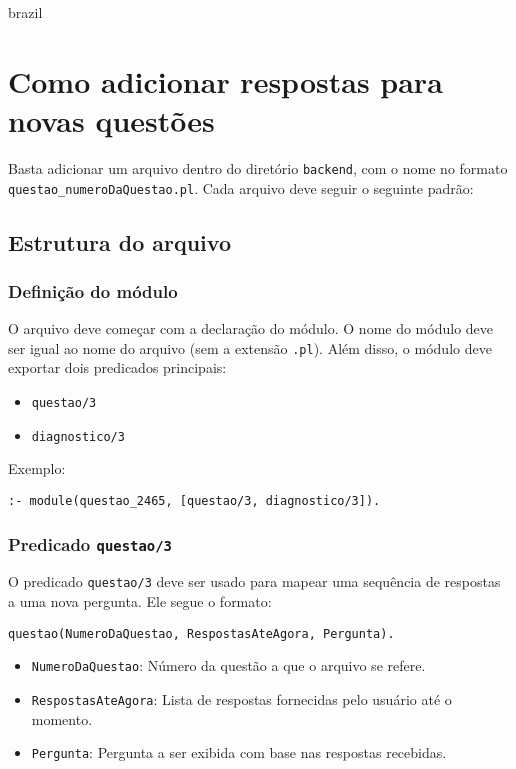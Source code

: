 \begin{otherlanguage*}{brazil}

\chapter{Como adicionar respostas para novas questões}
\label{manual:adicionar-respostas}

Basta adicionar um arquivo dentro do diretório \texttt{\/backend}, com o nome no formato \texttt{questao\_{numeroDaQuestao}.pl}. Cada arquivo deve seguir o seguinte padrão:

\section{Estrutura do arquivo}

\subsection{Definição do módulo}
O arquivo deve começar com a declaração do módulo. O nome do módulo deve ser igual ao nome do arquivo (sem a extensão \texttt{.pl}). Além disso, o módulo deve exportar dois predicados principais:  
\begin{itemize}
    \item \texttt{questao/3}
    \item \texttt{diagnostico/3}
\end{itemize}

Exemplo:
\begin{verbatim}
:- module(questao_2465, [questao/3, diagnostico/3]).
\end{verbatim}

\subsection{Predicado \texttt{questao/3}}
O predicado \texttt{questao/3} deve ser usado para mapear uma sequência de respostas a uma nova pergunta. Ele segue o formato:
\begin{verbatim}
questao(NumeroDaQuestao, RespostasAteAgora, Pergunta).
\end{verbatim}

\begin{itemize}
    \item \texttt{NumeroDaQuestao}: Número da questão a que o arquivo se refere.
    \item \texttt{RespostasAteAgora}: Lista de respostas fornecidas pelo usuário até o momento.
    \item \texttt{Pergunta}: Pergunta a ser exibida com base nas respostas recebidas.
\end{itemize}


\end{otherlanguage*}
